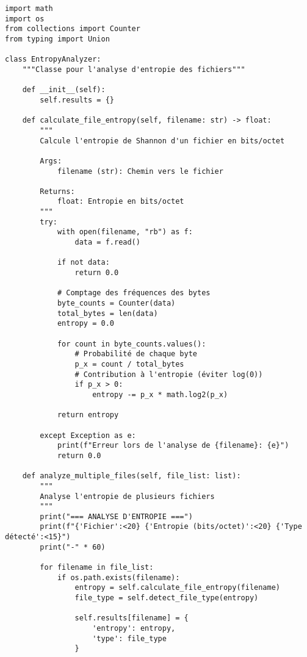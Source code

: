 \documentclass[12pt,a4paper]{article}
\begin{document}
\begin{lstlisting}[caption=Script Python complet pour le calcul d'entropie]
import math
import os
from collections import Counter
from typing import Union

class EntropyAnalyzer:
    """Classe pour l'analyse d'entropie des fichiers"""
    
    def __init__(self):
        self.results = {}
    
    def calculate_file_entropy(self, filename: str) -> float:
        """
        Calcule l'entropie de Shannon d'un fichier en bits/octet
        
        Args:
            filename (str): Chemin vers le fichier
            
        Returns:
            float: Entropie en bits/octet
        """
        try:
            with open(filename, "rb") as f:
                data = f.read()
            
            if not data:
                return 0.0
            
            # Comptage des fréquences des bytes
            byte_counts = Counter(data)
            total_bytes = len(data)
            entropy = 0.0
            
            for count in byte_counts.values():
                # Probabilité de chaque byte
                p_x = count / total_bytes
                # Contribution à l'entropie (éviter log(0))
                if p_x > 0:
                    entropy -= p_x * math.log2(p_x)
            
            return entropy
            
        except Exception as e:
            print(f"Erreur lors de l'analyse de {filename}: {e}")
            return 0.0
    
    def analyze_multiple_files(self, file_list: list):
        """
        Analyse l'entropie de plusieurs fichiers
        """
        print("=== ANALYSE D'ENTROPIE ===")
        print(f"{'Fichier':<20} {'Entropie (bits/octet)':<20} {'Type détecté':<15}")
        print("-" * 60)
        
        for filename in file_list:
            if os.path.exists(filename):
                entropy = self.calculate_file_entropy(filename)
                file_type = self.detect_file_type(entropy)
                
                self.results[filename] = {
                    'entropy': entropy,
                    'type': file_type
                }
                

\end{lstlisting}
\end{document}
